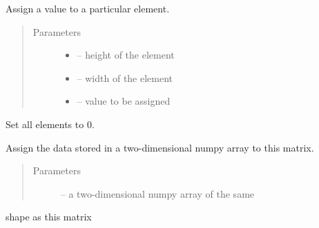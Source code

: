 \documentclass[letterpaper,10pt,english]{sphinxmanual}
\begin{document}
\begin{fulllineitems}
\begin{fulllineitems}
\label{\detokenize{index:dbm_py.interface.Matrix.assign}}
Assign a value to a particular element.
\begin{quote}\begin{description}
\item[{Parameters}] \leavevmode\begin{itemize}
\item {} 
 -- height of the element

\item {} 
 -- width of the element

\item {} 
 -- value to be assigned

\end{itemize}

\end{description}\end{quote}

\end{fulllineitems}


\begin{fulllineitems}
\label{\detokenize{index:dbm_py.interface.Matrix.clear}}
Set all elements to 0.

\end{fulllineitems}


\begin{fulllineitems}
\label{\detokenize{index:dbm_py.interface.Matrix.from_np2darray}}
Assign the data stored in a two-dimensional numpy array to
this matrix.
\begin{quote}\begin{description}
\item[{Parameters}] \leavevmode
{} -- a two-dimensional numpy array of the same

\end{description}\end{quote}

shape as this matrix


\end{fulllineitems}
\end{fulllineitems}
\end{document}
